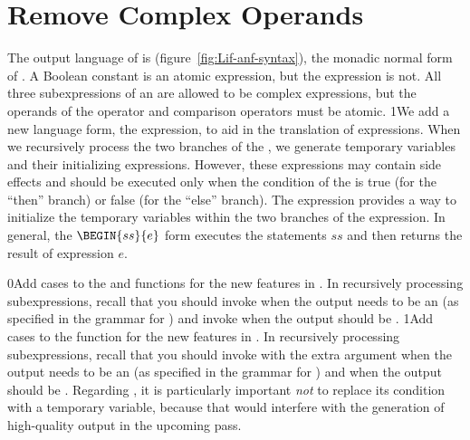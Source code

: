 \documentclass[7x10]{TimesAPriori_MIT}%
\def\racketEd{0}
\def\pythonEd{1}
\def\edition{1}
\newcommand{\racket}[1]{{\if\edition\racketEd{#1}\fi}}
\newcommand{\pythonColor}[0]{}
\newcommand{\python}[1]{{\if\edition\pythonEd\pythonColor #1\fi}}
\numberwithin{theorem}{chapter}
\numberwithin{definition}{chapter}
\numberwithin{equation}{chapter}
\begin{document}
\section{Remove Complex Operands}
\label{sec:remove-complex-opera-Lif}

The output language of  is
\LangIfANF{} (figure~\ref{fig:Lif-anf-syntax}), the monadic
normal form of \LangIf{}.  A Boolean constant is an atomic expression,
but the  expression is not.  All three subexpressions of an
 are allowed to be complex expressions, but the operands of
the  operator and comparison operators must be atomic.
%
\python{We add a new language form, the  expression, to aid
  in the translation of \code{if} expressions. When we recursively
  process the two branches of the \code{if}, we generate temporary
  variables and their initializing expressions. However, these
  expressions may contain side effects and should be executed only
  when the condition of the \code{if} is true (for the ``then''
  branch) or false (for the ``else'' branch). The \code{Begin} expression
  provides a way to initialize the temporary variables within the two branches
  of the \code{if} expression.  In general, the $\BEGIN{ss}{e}$
  form executes the statements $ss$ and then returns the result of
  expression $e$.}

\racket{Add cases to the  and 
  functions for the new features in \LangIf{}. In recursively
  processing subexpressions, recall that you should invoke
  \code{rco\_atom} when the output needs to be an \Atm{} (as specified
  in the grammar for \LangIfANF{}) and invoke  when the
  output should be \Exp{}.}
%
\python{Add cases to the \code{rco\_exp} function for the new features
  in \LangIf{}. In recursively processing subexpressions, recall that
  you should invoke \code{rco\_exp} with the extra argument
  \code{True} when the output needs to be an \Atm{} (as specified in
  the grammar for \LangIfANF{}) and \code{False} when the output
  should be \Exp{}.}
%
Regarding , it is particularly important \emph{not} to
replace its condition with a temporary variable, because that would
interfere with the generation of high-quality output in the upcoming
 pass.

\newcommand{\LifMonadASTRacket}{
\begin{array}{rcl}
\Atm &::=& \BOOL{\itm{bool}}\\
\Exp &::=& \UNIOP{\key{\textquotesingle not}}{\Atm} 
     \MID \BINOP{\itm{cmp}}{\Atm}{\Atm} 
     \MID \IF{\Exp}{\Exp}{\Exp} 
\end{array}
}
  
\end{document}
